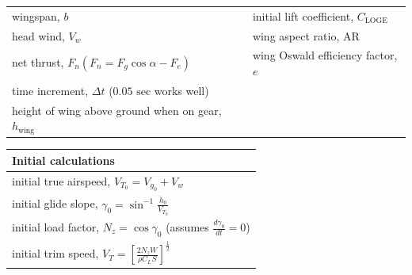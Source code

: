 \documentclass[
]{book}
\begin{document}
\begin{longtable}[]{@{}ll@{}}
\begin{minipage}[t]{0.56\columnwidth}
wingspan, \(b\)\strut
\end{minipage} & \begin{minipage}[t]{0.38\columnwidth}\raggedright
initial lift coefficient, \(C_{\mathrm{LOGE}}\)\strut
\end{minipage}\tabularnewline
\begin{minipage}[t]{0.56\columnwidth}\raggedright
head wind, \(V_w\)\strut
\end{minipage} & \begin{minipage}[t]{0.38\columnwidth}\raggedright
wing aspect ratio, \(\mathrm{AR}\)\strut
\end{minipage}\tabularnewline
\begin{minipage}[t]{0.56\columnwidth}\raggedright
net thrust, \(F_n \left( F_n = F_g \cos \alpha - F_e \right)\)\strut
\end{minipage} & \begin{minipage}[t]{0.38\columnwidth}\raggedright
wing Oswald efficiency factor, \(e\)\strut
\end{minipage}\tabularnewline
\begin{minipage}[t]{0.56\columnwidth}\raggedright
time increment, \(\Delta t\) (\(0.05 \text{ sec}\) works well)\strut
\end{minipage} & \begin{minipage}[t]{0.38\columnwidth}\raggedright
\strut
\end{minipage}\tabularnewline
\begin{minipage}[t]{0.56\columnwidth}\raggedright
height of wing above ground when on gear, \(h_{\text{wing}}\)\strut
\end{minipage} & \begin{minipage}[t]{0.38\columnwidth}\raggedright
\strut
\end{minipage}\tabularnewline
\bottomrule
\end{longtable}

\begin{longtable}[]{@{}l@{}}
\toprule
\begin{minipage}[b]{0.97\columnwidth}\raggedright
Initial calculations\strut
\end{minipage}\tabularnewline
\midrule
\endhead
\begin{minipage}[t]{0.97\columnwidth}\raggedright
initial true airspeed, \(V_{T_0} = V_{g_0} + V_w\)\strut
\end{minipage}\tabularnewline
\begin{minipage}[t]{0.97\columnwidth}\raggedright
initial glide slope, \(\gamma_0 = \sin^{-1} \frac{ \dot{h}_0 }{V_{T_0}}\)\strut
\end{minipage}\tabularnewline
\begin{minipage}[t]{0.97\columnwidth}\raggedright
initial load factor, \(N_z = \cos \gamma_0\) (assumes \(\frac{d \gamma_0}{dt} = 0\))\strut
\end{minipage}\tabularnewline
\begin{minipage}[t]{0.97\columnwidth}\raggedright
initial trim speed, \(V_T =\left[ \frac{2 N_z W}{\rho C_L S} \right]^{\frac{1}{2} }\)\strut
\end{minipage}\tabularnewline
\bottomrule
\end{longtable}
\end{document}
